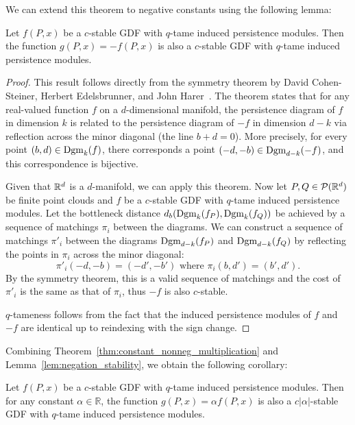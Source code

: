 We can extend this theorem to negative constants using the following lemma:
\begin{lemma}
    \label{lem:negation_stability}
    Let $f(P, x)$ be a $c$-stable GDF with $q$-tame induced persistence modules.
    Then the function $g(P, x) = - f(P, x)$ is also a $c$-stable GDF
    with $q$-tame induced persistence modules.
\end{lemma}
\begin{proof}
    This result follows directly from the symmetry theorem by David Cohen-Steiner,
    Herbert Edelsbrunner, and John Harer~\cite{cohen2009extending}.
    The theorem states that for any real-valued function $f$ on a
    $d$-dimensional manifold, the persistence diagram of $f$ in dimension $k$
    is related to the persistence diagram of $-f$ in dimension $d - k$ via
    reflection across the minor diagonal (the line $b + d = 0$).
    More precisely, for every point $(b, d) \in \operatorname{Dgm}_k(f)$, there corresponds a point
    $(-d, -b) \in \operatorname{Dgm}_{d - k}(-f)$, and this correspondence is bijective.

    Given that $\mathbb{R}^d$ is a $d$-manifold, we can apply this theorem.
    Now let $P, Q \in \mathcal{P}(\mathbb{R}^d)$ be finite point clouds and $f$ be a
    $c$-stable GDF with $q$-tame induced persistence modules.
    Let the bottleneck distance $d_b(\operatorname{Dgm}_k(f_P), \operatorname{Dgm}_k(f_Q))$ be achieved
    by a sequence of matchings $\pi_i$ between the diagrams.
    We can construct a sequence of matchings $\pi'_i$ between the diagrams
    $\operatorname{Dgm}_{d - k}(f_P)$ and $\operatorname{Dgm}_{d - k}(f_Q)$ by reflecting the points
    in $\pi_i$ across the minor diagonal:
    \begin{equation}
        \pi'_i(-d, -b) = (-d', -b') \text{ where } \pi_i(b, d') = (b', d').
    \end{equation}
    By the symmetry theorem, this is a valid sequence of matchings and the cost
    of $\pi'_i$ is the same as that of $\pi_i$, thus $-f$ is also $c$-stable.
    
    $q$-tameness follows from the fact that the induced persistence modules
    of $f$ and $-f$ are identical up to reindexing with the sign change.
\end{proof}

Combining Theorem~\ref{thm:constant_nonneg_multiplication} and
Lemma~\ref{lem:negation_stability}, we obtain the following corollary:
\begin{corollary}
    \label{cor:constant_multiplication}
    Let $f(P, x)$ be a $c$-stable GDF with $q$-tame induced persistence modules.
    Then for any constant $\alpha \in \mathbb{R}$, the function
    $g(P, x) = \alpha f(P, x)$ is also a $c|\alpha|$-stable GDF with
    $q$-tame induced persistence modules.
\end{corollary}

